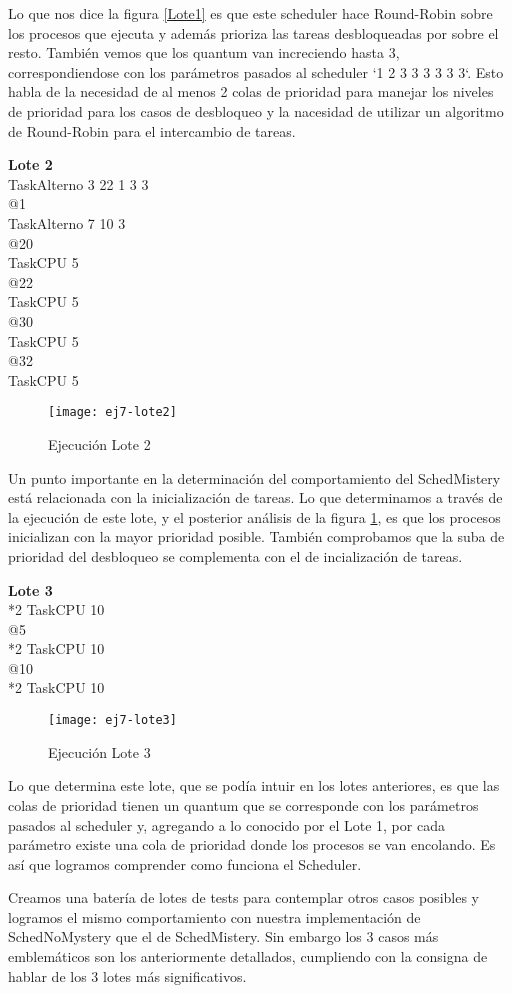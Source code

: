 Lo que nos dice la figura \ref{Lote1} es que este scheduler hace Round-Robin sobre los procesos que ejecuta y además prioriza las tareas desbloqueadas por sobre el resto. También vemos que los quantum van increciendo hasta 3, correspondiendose con los parámetros pasados al scheduler `1 2 3 3 3 3 3 3`. Esto habla de la necesidad de al menos 2 colas de prioridad para manejar los niveles de prioridad para los casos de desbloqueo y la nacesidad de utilizar un algoritmo de Round-Robin para el intercambio de tareas.

\bigskip

\textbf{Lote 2} \\
TaskAlterno 3 22 1 3 3 \\
@1 \\
TaskAlterno 7 10 3 \\
@20 \\
TaskCPU 5 \\
@22 \\
TaskCPU 5 \\
@30 \\
TaskCPU 5 \\
@32 \\
TaskCPU 5 \\

\begin{figure}[h]
    \texttt{[image: ej7-lote2]}
    \caption{Ejecución Lote 2}
    \label{Lote2}
\end{figure}

Un punto importante en la determinación del comportamiento del SchedMistery está relacionada con la inicialización de tareas. Lo que determinamos a través de la ejecución de este lote, y el posterior análisis de la figura \ref{Lote2}, es que los procesos inicializan con la mayor prioridad posible. También comprobamos que la suba de prioridad del desbloqueo se complementa con el de incialización de tareas.

\bigskip

\textbf{Lote 3} \\
*2 TaskCPU 10 \\
@5 \\
*2 TaskCPU 10 \\
@10 \\
*2 TaskCPU 10 \\

\begin{figure}[h]
    \texttt{[image: ej7-lote3]}
    \caption{Ejecución Lote 3}
    \label{Lote3}
\end{figure}

Lo que determina este lote, que se podía intuir en los lotes anteriores, es que las colas de prioridad tienen un quantum que se corresponde con los parámetros pasados al scheduler y, agregando a lo conocido por el Lote 1, por cada parámetro existe una cola de prioridad donde los procesos se van encolando. Es así que logramos comprender como funciona el Scheduler.

Creamos una batería de lotes de tests para contemplar otros casos posibles y logramos el mismo comportamiento con nuestra implementación de SchedNoMystery que el de SchedMistery. Sin embargo los 3 casos más emblemáticos son los anteriormente detallados, cumpliendo con la consigna de hablar de los 3 lotes más significativos.
